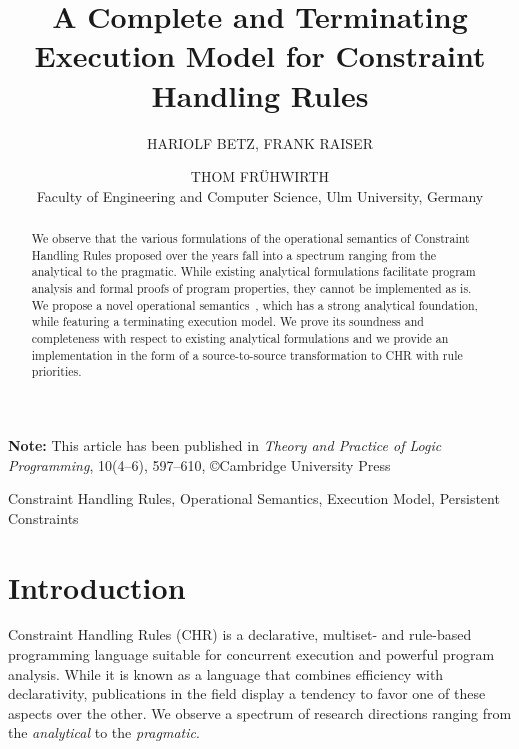 \documentclass{tlp}
\begin{document}
\title{A Complete and Terminating Execution Model for Constraint Handling Rules}

\author[Hariolf Betz, Frank Raiser and Thom Fr{\"u}hwirth]{HARIOLF BETZ,
FRANK RAISER \and THOM FR{\"U}HWIRTH\\
Faculty of Engineering and Computer Science, Ulm University, Germany\\
}

\maketitle

\textbf{Note: } This article has been published in \textit{Theory and Practice
of Logic Programming}, 10(4--6), 597--610, \copyright Cambridge University Press

\begin{abstract}
We observe that the various formulations of the operational semantics of
Constraint Handling Rules proposed over the years fall into a spectrum ranging
from the analytical to the pragmatic.
While existing analytical formulations facilitate program
analysis and formal proofs of program properties, they cannot be implemented as is.
We propose a novel operational semantics~, which has a strong
analytical foundation, while featuring a terminating execution model.
We prove its soundness and completeness with respect to existing analytical
formulations and we provide an implementation in the form of a source-to-source
transformation to CHR with rule priorities.
\end{abstract}

\begin{keywords}
Constraint Handling Rules, Operational Semantics, Execution Model, Persistent
Constraints
\end{keywords}

\section{Introduction}
\label{sec:intro}
Constraint Handling Rules \cite{fruehwirth09} (CHR) is a declarative, multiset-
and rule-based programming language suitable for concurrent execution and
powerful program analysis. While it is known as a language that combines
efficiency with declarativity, publications in the field display a tendency to
favor one of these aspects over the other. We observe a spectrum of research
directions ranging from the \emph{analytical} to the \emph{pragmatic}.
\end{document}
